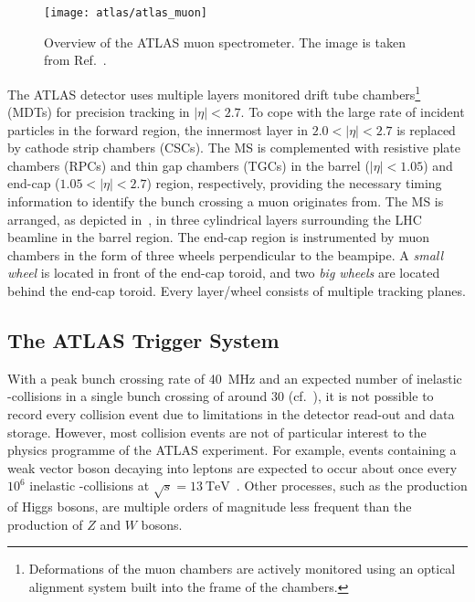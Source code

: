 \begin{figure}[htbp]
  \centering

  \texttt{[image: atlas/atlas\_muon]}

  \caption{Overview of the ATLAS muon spectrometer. The image is taken from
    Ref.~\cite{PERF-2007-01}.}%
  \label{fig:atlas_muon_system}
\end{figure}

The ATLAS detector uses multiple layers monitored drift tube
chambers\footnote{Deformations of the muon chambers are actively monitored using
  an optical alignment system built into the frame of the chambers.} (MDTs) for
precision tracking in $|\eta| < 2.7$. To cope with the large rate of incident
particles in the forward region, the innermost layer in $2.0 < |\eta| < 2.7$ is
replaced by cathode strip chambers (CSCs). The MS is complemented with resistive
plate chambers (RPCs) and thin gap chambers (TGCs) in the barrel
($|\eta| < 1.05$) and end-cap ($1.05 < |\eta| < 2.7$) region, respectively,
providing the necessary timing information to identify the bunch crossing a muon
originates from. The MS is arranged, as depicted
in~, in three cylindrical layers surrounding the LHC
beamline in the barrel region. The end-cap region is instrumented by muon
chambers in the form of three wheels perpendicular to the beampipe. A
\emph{small wheel} is located in front of the end-cap toroid, and two \emph{big
  wheels} are located behind the end-cap toroid. Every layer/wheel consists of
multiple tracking planes.


\subsection{The ATLAS Trigger System}%
\label{sec:atlas_trigger}

With a peak bunch crossing rate of \SI{40}{\mega\hertz} and an expected number
of inelastic \pp-collisions in a single bunch crossing of around \num{30} (cf.\
), it is not possible to record every collision event due
to limitations in the detector read-out and data storage. However, most
collision events are not of particular interest to the physics programme of the
ATLAS experiment. For example, events containing a weak vector boson decaying
into leptons are expected to occur about once every $10^6$ inelastic
\pp-collisions at $\sqrt{s} = \SI{13}{\TeV}$~\cite{STDM-2015-03}. Other
processes, such as the production of Higgs bosons, are multiple orders of
magnitude less frequent than the production of $Z$ and $W$ bosons.

